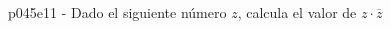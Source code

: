 \documentclass[spanish, 11pt]{exam}
\begin{document}
\begin{questions}
\begin{multicols}{2}
\begin{parts}
        \end{parts}
        \end{multicols}
        \question p045e11 - Dado el siguiente número $z$, calcula el valor de $z\cdot\overline{z}$
        \begin{multicols}{2} 
        \end{multicols}
        
    \end{questions}
    
\end{document}

